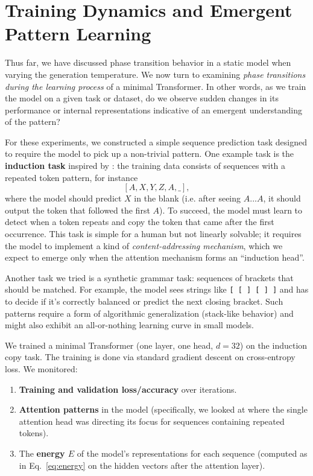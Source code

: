\documentclass[12pt]{article}
\begin{document}
\section{Training Dynamics and Emergent Pattern Learning}
Thus far, we have discussed phase transition behavior in a static model when varying the generation temperature. We now turn to examining \textit{phase transitions during the learning process} of a minimal Transformer. In other words, as we train the model on a given task or dataset, do we observe sudden changes in its performance or internal representations indicative of an emergent understanding of the pattern?

For these experiments, we constructed a simple sequence prediction task designed to require the model to pick up a non-trivial pattern. One example task is the \textbf{induction task} inspired by \citet{olsson2022}: the training data consists of sequences with a repeated token pattern, for instance 
\[ [A, X, Y, Z, A, \_] , \] 
where the model should predict $X$ in the blank (i.e. after seeing $A ... A$, it should output the token that followed the first $A$). To succeed, the model must learn to detect when a token repeats and copy the token that came after the first occurrence. This task is simple for a human but not linearly solvable; it requires the model to implement a kind of \emph{content-addressing mechanism}, which we expect to emerge only when the attention mechanism forms an ``induction head''.

Another task we tried is a synthetic grammar task: sequences of brackets that should be matched. For example, the model sees strings like \texttt{[ [ ] [ ] ]} and has to decide if it's correctly balanced or predict the next closing bracket. Such patterns require a form of algorithmic generalization (stack-like behavior) and might also exhibit an all-or-nothing learning curve in small models.

We trained a minimal Transformer (one layer, one head, $d=32$) on the induction copy task. The training is done via standard gradient descent on cross-entropy loss. We monitored:
\begin{enumerate}
    \item \textbf{Training and validation loss/accuracy} over iterations.
    \item \textbf{Attention patterns} in the model (specifically, we looked at where the single attention head was directing its focus for sequences containing repeated tokens).
    \item The \textbf{energy $E$} of the model's representations for each sequence (computed as in Eq.~\ref{eq:energy} on the hidden vectors after the attention layer).
\end{enumerate}
\end{document}
